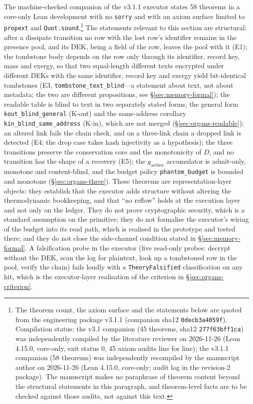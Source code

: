 \documentclass[11pt,a4paper]{article}
\newcommand{\gaether}{g_{\mathrm{aether}}}
\newcommand{\thm}[1]{\nolinkurl{#1}}
\begin{document}
The machine-checked companion of the v3.1.1 executor states 58 theorems in a core-only Lean development with no \texttt{sorry} and with an axiom surface limited to \texttt{propext} and \texttt{Quot.sound}.\footnote{The theorem count, the axiom surface and the statements below are quoted from the engineering package v3.1.1 (companion sha12 \texttt{0decb3a4059f}). Compilation status: the v3.1 companion (45 theorems, sha12 \texttt{277f63bff1ca}) was independently compiled by the literature reviewer on 2026-11-26 (Lean 4.15.0, core-only, exit status 0, 45 axiom audits line for line); the v3.1.1 companion (58 theorems) was independently recompiled by the manuscript author on 2026-11-26 (Lean 4.15.0, core-only; audit log in the revision-2 package). The manuscript makes no paraphrase of theorem content beyond the structural statements in this paragraph, and theorem-level facts are to be checked against those audits, not against this text.} The statements relevant to this section are structural: after a dissipate transition no row with the lost row's identifier remains in the presence pool, and its DEK, being a field of the row, leaves the pool with it (E1); the tombstone body depends on the row only through its identifier, record key, mass and exergy, so that two equal-length different texts encrypted under different DEKs with the same identifier, record key and exergy yield bit-identical tombstones (E3, \thm{tombstone_text_blind}---a statement about text, not about metadata; the two are different propositions, see \S\ref{sec:memory-formal}); the readable table is blind to text in two separately stated forms, the general form \thm{kout_blind_general} (K-out) and the same-address corollary \thm{kin_blind_same_address} (K-in), which are not merged (\S\ref{sec:organs-readable}); an altered link fails the chain check, and on a three-link chain a dropped link is detected (E4; the drop case takes hash injectivity as a hypothesis); the three transitions preserve the conservation core and the monotonicity of $D$, and no transition has the shape of a recovery (E5); the $\gaether$ accumulator is admit-only, monotone and content-blind, and the budget policy \thm{phantom_budget} is bounded and monotone (\S\ref{sec:organs-three}). These theorems are representation-layer objects: they establish that the executor adds structure without altering the thermodynamic bookkeeping, and that ``no reflow'' holds at the execution layer and not only on the ledger. They do not prove cryptographic security, which is a standard assumption on the primitive; they do not formalise the executor's wiring of the budget into its read path, which is realised in the prototype and tested there; and they do not close the side-channel condition stated in \S\ref{sec:memory-formal}. A falsification probe in the executor (five read-only probes: decrypt without the DEK, scan the log for plaintext, look up a tombstoned row in the pool, verify the chain) fails loudly with a \texttt{TheoryFalsified} classification on any hit, which is the executor-layer realisation of the criterion in \S\ref{sec:organs-criterion}.
\end{document}
